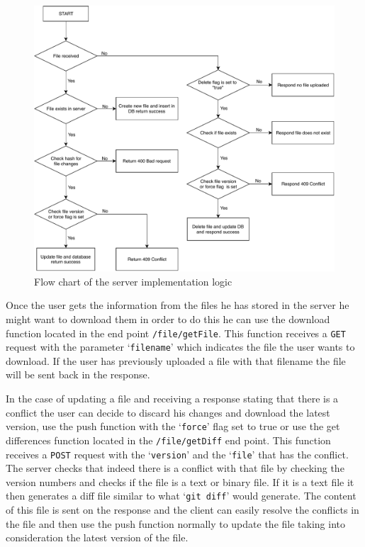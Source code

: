 \documentclass[11pt]{article}
\begin{document}
\begin{figure}[H]
	\centering
	\includegraphics[scale=0.6]{graphics/server-implementation-logic.pdf}
	\caption{Flow chart of the server implementation logic}
	\label{fig:server-implementation-logic}
\end{figure}

Once the user gets the information from the files he has stored in the server he might want to download them in order to do this he can use the download function located in the end point {\tt /file/getFile}. This function receives a {\tt GET} request with the parameter ‘{\tt filename}’ which indicates the file the user wants to download. If the user has previously uploaded a file with that filename the file will be sent back in the response.

In the case of updating a file and receiving a response stating that there is a conflict the user can decide to discard his changes and download the latest version, use the push function with the ‘{\tt force}’ flag set to true or use the get differences function located in the {\tt /file/getDiff} end point. This function receives a {\tt POST} request with the ‘{\tt version}’ and the ‘{\tt file}’ that has the conflict. The server checks that indeed there is a conflict with that file by checking the version numbers and checks if the file is a text or binary file. If it is a text file it then generates a diff file similar to what ‘{\tt git diff}’ would generate. The content of this file is sent on the response and the client can easily resolve the conflicts in the file and then use the push function normally to update the file taking into consideration the latest version of the file.
\end{document}
